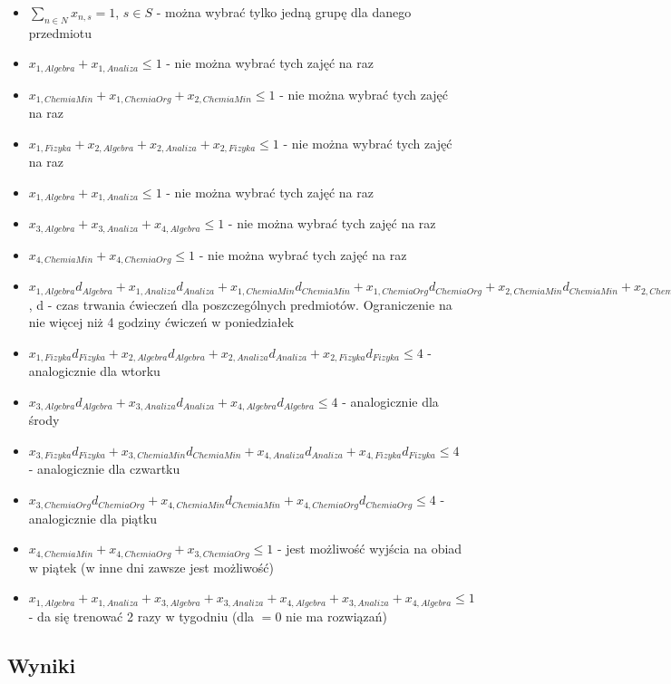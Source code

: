\documentclass[12pt, a4paper]{article}
\begin{document}
\begin{itemize}
  \item $\sum_{n \in N} x_{n, s} = 1$, $s \in S$ - można wybrać tylko jedną grupę dla danego przedmiotu
  \item $x_{1,Algebra} + x_{1,Analiza} \leq 1$ - nie można wybrać tych zajęć na raz
  \item $x_{1,ChemiaMin} + x_{1,ChemiaOrg} + x_{2,ChemiaMin} \leq 1$ - nie można wybrać tych zajęć na raz
  \item $x_{1,Fizyka} + x_{2,Algebra} + x_{2,Analiza} + x_{2,Fizyka} \leq 1$ - nie można wybrać tych zajęć na raz
  \item $x_{1,Algebra} + x_{1,Analiza} \leq 1$ - nie można wybrać tych zajęć na raz
  \item $x_{3,Algebra} + x_{3, Analiza} + x_{4,Algebra} \leq 1$ - nie można wybrać tych zajęć na raz
  \item $x_{4,ChemiaMin} + x_{4,ChemiaOrg} \leq 1$ - nie można wybrać tych zajęć na raz
  \item $x_{1,Algebra}d_{Algebra} + x_{1,Analiza}d_{Analiza} + x_{1,ChemiaMin}d_{ChemiaMin} + x_{1,ChemiaOrg}d_{ChemiaOrg} + x_{2,ChemiaMin}d_{ChemiaMin} + x_{2,ChemiaOrg}d_{ChemiaOrg} \leq 4$, d - czas trwania ćwieczeń dla poszczególnych predmiotów. Ograniczenie na nie więcej niż 4 godziny ćwiczeń w poniedziałek
  \item $x_{1,Fizyka}d_{Fizyka} + x_{2,Algebra}d_{Algebra} + x_{2,Analiza}d_{Analiza} + x_{2,Fizyka}d_{Fizyka} \leq 4$ - analogicznie dla wtorku
  \item $x_{3,Algebra}d_{Algebra} + x_{3,Analiza}d_{Analiza} + x_{4,Algebra}d_{Algebra} \leq 4$ - analogicznie dla środy
  \item $x_{3,Fizyka}d_{Fizyka} + x_{3,ChemiaMin}d_{ChemiaMin} + x_{4,Analiza}d_{Analiza} + x_{4,Fizyka}d_{Fizyka} \leq 4$ - analogicznie dla czwartku
  \item $x_{3,ChemiaOrg}d_{ChemiaOrg} + x_{4,ChemiaMin}d_{ChemiaMin} + x_{4,ChemiaOrg}d_{ChemiaOrg} \leq 4$ - analogicznie dla piątku
  \item $x_{4,ChemiaMin} + x_{4,ChemiaOrg} + x_{3,ChemiaOrg} \leq 1$ - jest możliwość wyjścia na obiad w piątek (w inne dni zawsze jest możliwość)
  \item $x_{1,Algebra} + x_{1,Analiza} + x_{3,Algebra} + x_{3,Analiza} + x_{4,Algebra} + x_{3, Analiza} + x_{4,Algebra} \leq 1$ - da się trenować 2 razy w tygodniu (dla $= 0$ nie ma rozwiązań)
\end{itemize}

\subsection{Wyniki}
\end{document}
